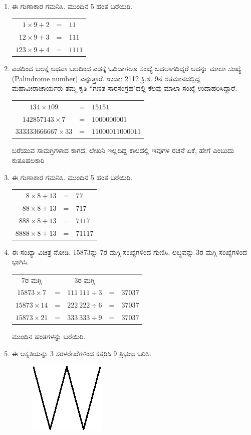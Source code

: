 \begin{enumerate}
\item ಈ ಗುಣಾಕಾರ ಗಮನಿಸಿ. ಮುಂದಿನ 5 ಹಂತ ಬರೆಯಿರಿ. 

{\fontsize{11pt}{13pt}\selectfont
\begin{tabular}[t]{rcl}
$1 \times 9 + 2$ & = & $11$\\
$12 \times 9 + 3$ & = & $111$\\
$123\times 9 + 4$ & = & $1111$
\end{tabular}}\relax

\item ಎಡದಿಂದ ಬಲಕ್ಕೆ ಅಥವಾ ಬಲದಿಂದ ಎಡಕ್ಕೆ ಓದಿದಾಗಲೂ ಸಂಖ್ಯೆ ಬದಲಾಗದಿದ್ದರೆ ಅದನ್ನು ಮಾಲಾ ಸಂಖ್ಯೆ (Palindrome number) ಎನ್ನುತ್ತಾರೆ. ಉದಾ: 2112 ಕ್ರಿ.ಶ. 9ನೆ ಶತಮಾನದಲ್ಲಿದ್ದ ಮಹಾವೀರಾಚಾರ್ಯರು ತಮ್ಮ ಕೃತಿ ``ಗಣಿತ ಸಾರ\break ಸಂಗ್ರಹ"ದಲ್ಲಿ ಕೆಲವು ಮಾಲಾ ಸಂಖ್ಯೆ ಉದಾಹರಿಸಿದ್ದಾರೆ. 

\begin{tabular}[t]{ccl}
$134\times 109$ & = & $15151$\\
$142857143\times 7$ & = & $1000000001$\\
$333333666667\times 33$ & = & $11000011000011$
\end{tabular}

ಬರೆಯುವ ಸಾಮಗ್ರಿಗಳಾದ ಕಾಗದ, ಲೇಖನಿ ಇಲ್ಲದಿದ್ದ ಕಾಲದಲ್ಲಿ ಇವುಗಳ ರಚನೆ ಏಕೆ, ಹೇಗೆ ಎಂಬುದು ಕುತೂಹಲಕಾರಿ 

\item ಈ ಗುಣಾಕಾರ ಗಮನಿಸಿ. ಮುಂದಿನ 5 ಹಂತ ಬರೆಯಿರಿ. 

\begin{tabular}[t]{rcl}
$8\times 8 + 13$ & = & $77$\\
$88\times 8 + 13$ & = & $717$\\
$888\times 8 + 13$ & = & $7117$\\
$8888\times 8 + 13$ & = & $71117$
\end{tabular}

\item ಈ ಸಂಖ್ಯಾ ವಿಚಿತ್ರ ನೋಡಿ. 15873ನ್ನು 7ರ ಮಗ್ಗಿ ಸಂಖ್ಯೆಗಳಿಂದ ಗುಣಿಸಿ, ಲಬ್ಧವನ್ನು 3ರ ಮಗ್ಗಿ ಸಂಖ್ಯೆಗಳಿಂದ ಭಾಗಿಸಿ. 

\begin{tabular}[t]{ccccc}
\qquad 7ರ ಮಗ್ಗಿ &  & \qquad 3ರ ಮಗ್ಗಿ & & \\
$15873\times 7$ & = & $111~111\div 3$ & = & $37037$\\
$15873\times 14$ & = & $222~222\div 6$ & = & $37037$\\
$15873\times 21$ & = & $333~333\div 9$ & = & $37037$
\end{tabular}

ಮುಂದಿನ ಹಂತಗಳನ್ನು ಬರೆಯಿರಿ. 

\item ಈ ಆಕೃತಿಯನ್ನು 3 ಸರಳರೇಖೆಗಳಿಂದ ಕತ್ತರಿಸಿ 9 ತ್ರಿಭುಜ ಬರಿಸಿ. 
\begin{figure}[H]
\centering
\includegraphics{images/chap6/q14.eps}
\end{figure}


\end{enumerate}
